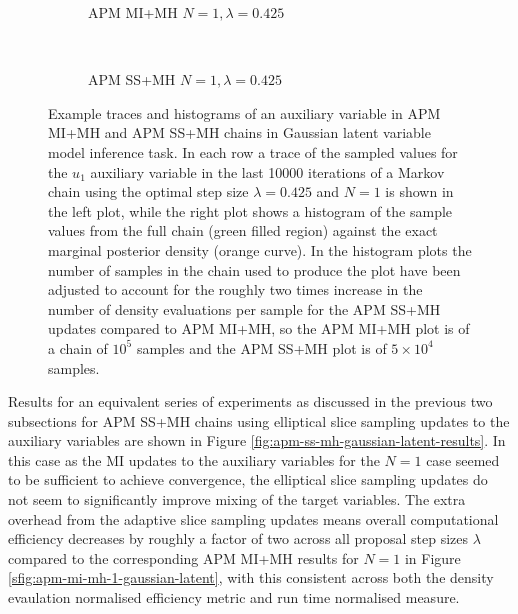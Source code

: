 \begin{figure}
\centering
\begin{subfigure}[b]{\linewidth}
\centering
  \vspace{-5mm}
  \caption{\ac{APM} \ac{MI}+\ac{MH} $N=1, \lambda=0.425$}
  \label{sfig:apm-mi-mh-1-gaussian-latent-u-trace}
\end{subfigure}
\\[3mm]
\begin{subfigure}[b]{\linewidth}
\centering
  \vspace{-5mm}
  \caption{\ac{APM} \ac{SS}+\ac{MH} $N=1, \lambda=0.425$}
  \label{sfig:apm-ss-mh-1-gaussian-latent-u-trace}
\end{subfigure}
\caption[\acs{APM} Gaussian model auxiliary variable traces.]{
Example traces and histograms of an auxiliary variable in \ac{APM} \ac{MI}+\ac{MH} and \ac{APM} \ac{SS}+\ac{MH} chains in Gaussian latent variable model inference task. In each row a trace of the sampled values for the $u_1$ auxiliary variable in the last 10000 iterations of a Markov chain using the optimal step size $\lambda=0.425$ and $N=1$ is shown in the left plot, while the right plot shows a histogram of the sample values from the full chain (green filled region) against the exact marginal posterior density (orange curve). In the histogram plots the number of samples in the chain used to produce the plot have been adjusted to account for the roughly two times increase in the number of density evaluations per sample for the  
\ac{APM} \ac{SS}+\ac{MH} updates compared to \ac{APM} \ac{MI}+\ac{MH}, so the \ac{APM} \ac{MI}+\ac{MH} plot is of a chain of $10^5$ samples and the \ac{APM} \ac{SS}+\ac{MH} plot is of $5\times 10^4$ samples.}
\label{fig:apm-mh-gaussian-latent-u-traces}
\end{figure}

Results for an equivalent series of experiments as discussed in the previous two subsections for \ac{APM} \ac{SS}+\ac{MH} chains using elliptical slice sampling updates to the auxiliary variables are shown in Figure \ref{fig:apm-ss-mh-gaussian-latent-results}. In this case as the \ac{MI} updates to the auxiliary variables for the $N=1$ case seemed to be sufficient to achieve convergence, the elliptical slice sampling updates do not seem to significantly improve mixing of the target variables. The extra overhead from the adaptive slice sampling updates means overall computational efficiency decreases by roughly a factor of two across all proposal step sizes $\lambda$ compared to the corresponding \ac{APM} \ac{MI}+\ac{MH} results for $N=1$ in Figure \ref{sfig:apm-mi-mh-1-gaussian-latent}, with this consistent across both the density evaulation normalised efficiency metric and run time normalised measure. 

